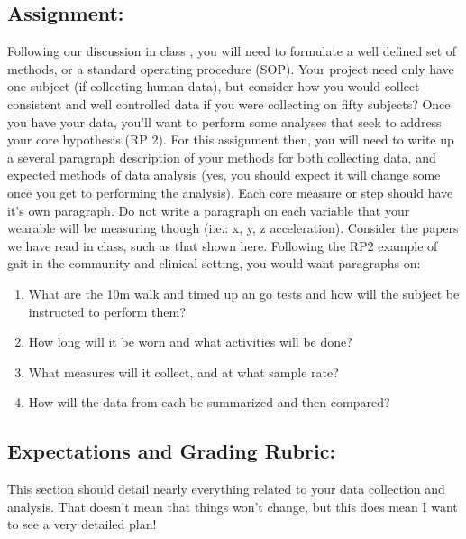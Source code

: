 \documentclass[11pt]{article}
\begin{document}
\subsection*{Assignment:}
Following our discussion in class , you will need to formulate a well defined set of methods, or a standard operating procedure (SOP). Your project need only have one subject (if collecting human data), but consider how you would collect consistent and well controlled data if you were collecting on fifty subjects? Once you have your data, you’ll want to perform some analyses that seek to address your core hypothesis (RP 2). For this assignment then, you will need to write up a several paragraph description of your methods for both collecting data, and expected methods of data analysis (yes, you should expect it will change some once you get to performing the analysis). Each core measure or step should have it's own paragraph. Do not write a paragraph on each variable that your wearable will be measuring though (i.e.: x, y, z acceleration). Consider the papers we have read in class, such as that shown here. Following the RP2 example of gait in the community and clinical setting, you would want paragraphs on:
\begin{enumerate}
    \item[clinical gait:] What are the 10m walk and timed up an go tests and how will the subject be instructed to perform them?
    \item[community gait:] How long will it be worn and what activities will be done?
    \item[your wearable:] What measures will it collect, and at what sample rate?
    \item[analysis:] How will the data from each be summarized and then compared?
\end{enumerate}


\subsection*{Expectations and Grading Rubric:}
This section should detail nearly everything related to your data collection and analysis.  That doesn't mean that things won't change, but this does mean I want to see a very detailed plan!
\end{document}
